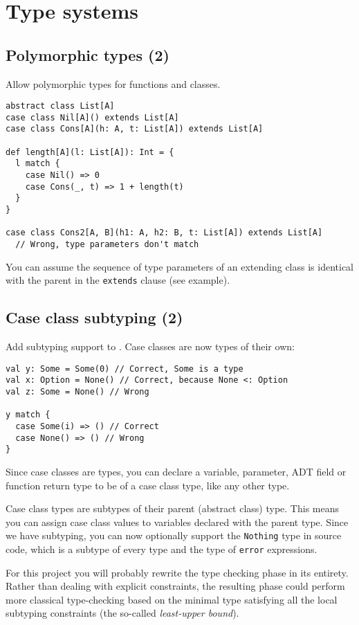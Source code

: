 \section{Type systems}

\subsection{Polymorphic types (2)}
Allow polymorphic types for functions and classes.

\begin{lstlisting}
abstract class List[A]
case class Nil[A]() extends List[A]
case class Cons[A](h: A, t: List[A]) extends List[A]

def length[A](l: List[A]): Int = {
  l match {
    case Nil() => 0
    case Cons(_, t) => 1 + length(t)
  }
}

case class Cons2[A, B](h1: A, h2: B, t: List[A]) extends List[A]
  // Wrong, type parameters don't match
\end{lstlisting}

You can assume the sequence of type parameters of an extending class 
is identical with the parent in the \lstinline{extends} clause
(see example).

\subsection{Case class subtyping (2)}
Add subtyping support to \langname.
Case classes are now types of their own:
\begin{lstlisting}
val y: Some = Some(0) // Correct, Some is a type
val x: Option = None() // Correct, because None <: Option
val z: Some = None() // Wrong

y match {
  case Some(i) => () // Correct
  case None() => () // Wrong
}
\end{lstlisting}

Since case classes are types, you can declare a variable, parameter,
ADT field or function return type to be of a case class type,
like any other type.

Case class types are subtypes of their parent (abstract class) type.
This means you can assign case class values to variables
declared with the parent type.
Since we have subtyping, you can now optionally support the \lstinline{Nothing}
type in source code, which is a subtype of every type
and the type of \lstinline{error} expressions.

For this project you will probably rewrite the type checking phase in its entirety.
Rather than dealing with explicit constraints, the resulting phase could perform
more classical type-checking based on the minimal type satisfying all the local
subtyping constraints (the so-called \emph{least-upper bound}).


